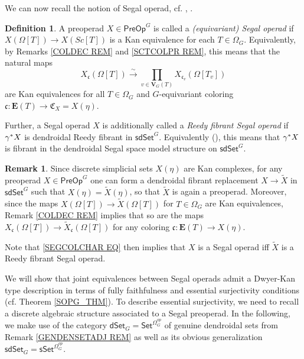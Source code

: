 \documentclass[a4paper,10pt
,draft
]{article}%
\numberwithin{equation}{section}
\numberwithin{figure}{section}
\theoremstyle{definition} %
\newtheorem{definition}[equation]{Definition}%
\newtheorem{remark}[equation]{Remark}%
\newcommand{\sdSet}{\mathsf{sdSet}}
\newcommand{\1}{\ensuremath{\mathbbm 1}}%
\begin{document}
We can now recall the notion of 
Segal operad, 
cf. \cite[Def. 5.5]{CM13b}, \cite[Def. 4.40]{BP_edss}.


\begin{definition}\label{SEGCOLCHAR DEF}
	A preoperad $X \in \mathsf{PreOp}^G$ is called a \emph{(equivariant) Segal operad} if
	$X\left( \Omega[T] \right) \to 
	X \left( Sc[T] \right)$
	is a Kan equivalence for each $T \in \Omega_G$.
%
	Equivalently, by Remarks \ref{COLDEC REM}
	and \ref{SCTCOLPR REM},
	this means that the natural maps
\begin{equation}\label{SEGCOLCHAR EQ}
	X_{\mathfrak{c}}(\Omega[T])
	\xrightarrow{\sim}
		\prod_{v \in \boldsymbol{V}_G(T)}
	X_{\mathfrak{c}_v}(\Omega[T_v])
\end{equation}
	are Kan equivalences for all 
	$T \in \Omega_G$
	and $G$-equivariant coloring
	$\mathfrak{c} \colon 
	\boldsymbol{E}(T) \to \mathfrak{C}_X = X(\eta)$.
	
	Further, a Segal operad $X$ is additionally called a
	\emph{Reedy fibrant Segal operad} 
	if $\gamma^{\**}X$ is dendroidal Reedy fibrant in $\sdSet^G$.
	Equivalently (\cite[Remark 4.41]{BP_edss}),
	this means that $\gamma^{\**}X$ is fibrant in the dendroidal Segal space model structure on $\sdSet^G$.
\end{definition}



\begin{remark}\label{REPSEGOPS REM}
Since discrete simplicial sets 
$X(\eta)$ are Kan complexes,
for any preoperad 
$X \in \mathsf{PreOp}^G$
one can form a dendroidal 
fibrant replacement 
$X \to \widetilde{X}$ in 
$\mathsf{sdSet}^G$
such that 
$X(\eta) = \widetilde{X}(\eta)$,
so that $\widetilde{X}$
is again a preoperad.
Moreover, since the maps
$X(\Omega[T]) \to \widetilde{X}(\Omega[T])$ for $T \in \Omega_G$
are Kan equivalences,
Remark \ref{COLDEC REM}
implies that so are the maps
$X_{\mathfrak{c}}(\Omega[T]) \to \widetilde{X}_{\mathfrak{c}}(\Omega[T])$
for any coloring
$\mathfrak{c} \colon \boldsymbol{E}(T) \to X(\eta)$.

Note that \eqref{SEGCOLCHAR EQ} 
then implies that $X$ is a Segal operad iff 
$\widetilde{X}$ is a Reedy fibrant Segal operad.
\end{remark}



We will show that joint equivalences 
between Segal operads
admit a Dwyer-Kan type description 
in terms of fully faithfulness and essential surjectivity 
conditions (cf. Theorem \ref{SOPG_THM}).
To describe essential surjectivity,
we need to recall a discrete 
algebraic structure associated to a Segal preoperad.
In the following, we make use of the category
$\mathsf{dSet}_G= \mathsf{Set}^{\Omega_G^{op}}$
of genuine dendroidal sets from
Remark \ref{GENDENSETADJ REM}
as well as its obvious generalization
$\mathsf{sdSet}_G= \mathsf{sSet}^{\Omega_G^{op}}$.
\end{document}
